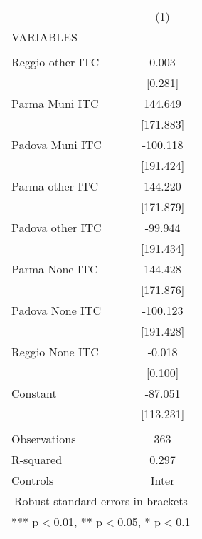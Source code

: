 \begin{tabular}{lc} \hline
 & (1) \\
VARIABLES &  \\ \hline
 &  \\
Reggio other ITC & 0.003 \\
 & [0.281] \\
Parma Muni ITC & 144.649 \\
 & [171.883] \\
Padova Muni ITC & -100.118 \\
 & [191.424] \\
Parma other ITC & 144.220 \\
 & [171.879] \\
Padova other ITC & -99.944 \\
 & [191.434] \\
Parma None ITC & 144.428 \\
 & [171.876] \\
Padova None ITC & -100.123 \\
 & [191.428] \\
Reggio None ITC & -0.018 \\
 & [0.100] \\
Constant & -87.051 \\
 & [113.231] \\
 &  \\
Observations & 363 \\
R-squared & 0.297 \\
 Controls & Inter \\ \hline
\multicolumn{2}{c}{ Robust standard errors in brackets} \\
\multicolumn{2}{c}{ *** p$<$0.01, ** p$<$0.05, * p$<$0.1} \\
\end{tabular}
